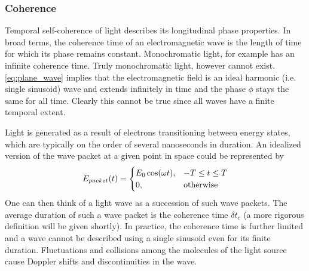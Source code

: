 
\subsubsection{Coherence}
Temporal self-coherence of light describes its longitudinal phase properties. In broad terms, the coherence time of an electromagnetic wave is the length of time for which its phase remains constant. Monochromatic light, for example has an infinite coherence time. Truly monochromatic light, however cannot exist. \autoref{eq:plane_wave} implies that the electromagnetic field is an ideal harmonic (i.e. single sinusoid) wave and extends infinitely in time and the phase $\phi$ stays the same for all time. Clearly this cannot be true since all waves have a finite temporal extent. 

Light is generated as a result of electrons transitioning between energy states, which are typically on the order of several nanoseconds in duration. An idealized version of the wave packet at a given point in space could be represented by
\begin{align}\label{eq:wavepacket}
E_{packet}(t) = 
\begin{cases}
E_0\cos(\omega t), & -T \leq t \leq T \\
0, &\textnormal{otherwise}
\end{cases}
\end{align}
One can then think of a light wave as a succession of such wave packets. The average duration of such a wave packet is the coherence time $\delta t_c$ (a more rigorous definition will be given shortly). In practice, the coherence time is further limited and a wave cannot be described using a single sinusoid even for its finite duration. Fluctuations and collisions among the molecules of the light source cause Doppler shifts and discontinuities in the wave.

